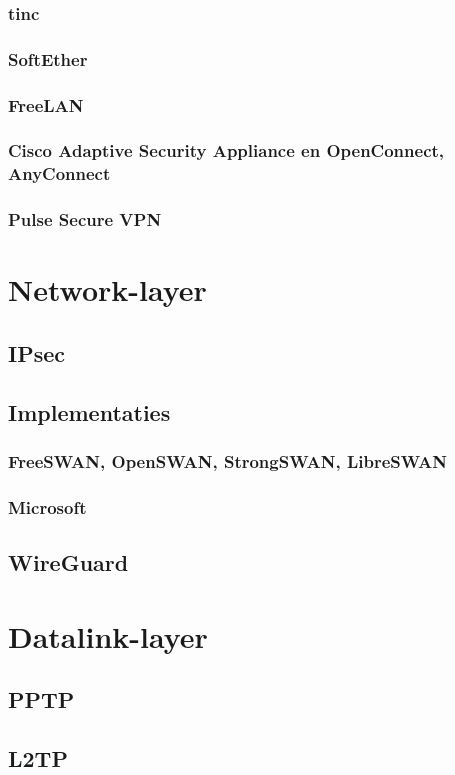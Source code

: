 \documentclass[a4paper,12pt,twoside,openright,titlepage]{book}
\begin{document}
\subsection{tinc}
\subsection{SoftEther}
\subsection{FreeLAN}
\subsection{Cisco Adaptive Security Appliance en OpenConnect, AnyConnect}
\subsection{Pulse Secure VPN}

\chapter{Network-layer}
\section{IPsec}

\section{Implementaties}
\subsection{FreeSWAN, OpenSWAN, StrongSWAN, LibreSWAN}
\subsection{Microsoft}
\section{WireGuard}

\chapter{Datalink-layer}
\section{PPTP}
\section{L2TP}


\printindex
\end{document}
